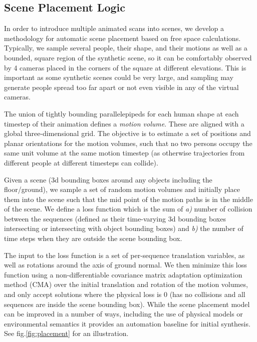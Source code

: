 \documentclass[10pt,twocolumn,letterpaper]{article}
\begin{document}
\subsection{Scene Placement Logic}
\label{sec:scene_placement}
In order to introduce multiple animated scans into scenes, we develop a methodology for automatic scene placement based on free space calculations. Typically, we sample several people, their shape, and their motions as well as a bounded, square region of the synthetic scene, so it can be comfortably observed by 4 cameras placed in the corners of the square at different elevations. This is important as some synthetic scenes could be very large, and sampling may generate people spread too far apart or not even visible in any of the virtual cameras. 

The union of tightly bounding parallelepipeds for each human shape at each timestep of their animation defines a 
\emph{motion volume}. These are aligned with a global three-dimensional grid. 
The objective is to estimate a set of positions and planar orientations for the motion volumes, such that no two persons occupy the same unit volume at the same motion timestep (as otherwise trajectories from different people at different timesteps can collide).

Given a scene (3d bounding boxes around any objects including the floor/ground), we sample a set of random motion volumes and initially place them into the scene such that the mid point of the motion paths is in the middle of the scene. We define a loss function which is the sum of {\it a)} number of collision between the sequences (defined as their time-varying 3d bounding boxes intersecting or intersecting with object bounding boxes) and {\it b)} the number of time steps when they are outside the scene bounding box. 


The input to the loss function is a set of per-sequence translation variables, as well as rotations around the axis of ground normal. We then minimize this loss function using a non-differentiable covariance matrix adaptation optimization method (CMA)\cite{Hansen2006} over the initial translation and rotation of the motion volumes, 
and only accept solutions where the physical loss is 0 (\ie has no collisions and all sequences are inside the scene bounding box). While the scene placement model can be improved in a number of ways, including the use of physical models or environmental semantics it provides an automation baseline for initial synthesis.
See fig.\ref{fig:placement} for an illustration.
\end{document}
